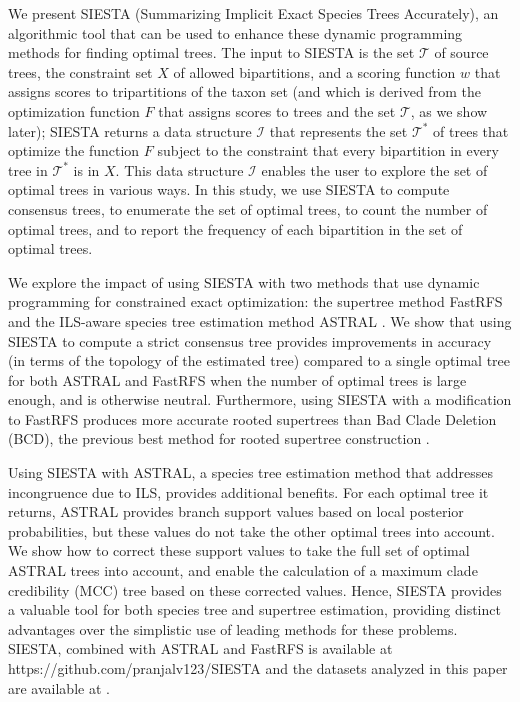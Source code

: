 We present SIESTA (Summarizing Implicit Exact Species Trees Accurately), an algorithmic tool that can be used to enhance these dynamic programming methods for finding optimal trees. 
The input to SIESTA is the set $\mathcal{T}$ of source trees, the constraint set $X$ of allowed bipartitions, and a scoring function $w$ that assigns scores to tripartitions of the taxon set (and which is derived from the optimization function $F$ that assigns scores to trees and the set $\mathcal{T}$, as we show later); SIESTA  returns a  data structure $\mathcal{I}$ that represents the set $\mathcal{T}^*$ of trees that optimize the function $F$ subject to the constraint that every bipartition in every tree in $\mathcal{T}^*$ is in $X$. 
This data structure $\mathcal{I}$ enables the user to explore the set of optimal trees in various ways. 
In this study, we use SIESTA to compute consensus trees, to enumerate the set of optimal trees,
to count the number of optimal trees,  and to report the frequency of each bipartition in the set of optimal trees.  

We explore the impact of using SIESTA with  two methods that use  dynamic programming  for constrained exact optimization: the supertree method FastRFS  \cite{vachaspati2017fastrfs} and the ILS-aware species  tree estimation method ASTRAL \cite{mirarab2015astral}.
We show that using SIESTA to compute a strict consensus tree provides improvements in accuracy (in terms of the topology of the estimated tree) compared to a single optimal tree for both ASTRAL and FastRFS when the number of optimal trees is large enough, and is otherwise neutral.  
Furthermore, using SIESTA with a modification to FastRFS produces more accurate rooted supertrees than Bad Clade Deletion (BCD), the previous best method for rooted supertree construction \cite{fleischauer2017bad}. 

Using SIESTA with ASTRAL, a species tree estimation method that addresses incongruence due to ILS, provides additional benefits.
For each optimal  tree it returns, ASTRAL provides branch support values based on local posterior probabilities, but these values do not take the other optimal trees into account.
We show how to correct these support values   to take the full set of optimal ASTRAL trees into account, and enable the calculation of a maximum clade credibility (MCC) tree based on these corrected values.
Hence, SIESTA provides a valuable tool for both species tree and supertree estimation, providing distinct advantages over the simplistic use of  leading methods for these problems.
SIESTA, combined with ASTRAL and FastRFS  is available at
https://github.com/pranjalv123/SIESTA and
the datasets analyzed in this paper are available at \cite{siesta-data}.


